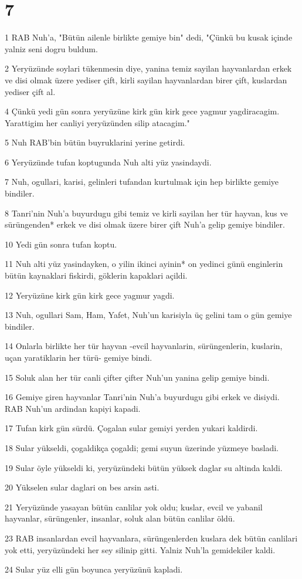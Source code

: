 \chapter{7}

\par 1 RAB Nuh'a, "Bütün ailenle birlikte gemiye bin" dedi, "Çünkü bu kusak içinde yalniz seni dogru buldum.
\par 2 Yeryüzünde soylari tükenmesin diye, yanina temiz sayilan hayvanlardan erkek ve disi olmak üzere yediser çift, kirli sayilan hayvanlardan birer çift, kuslardan yediser çift al.
\par 4 Çünkü yedi gün sonra yeryüzüne kirk gün kirk gece yagmur yagdiracagim. Yarattigim her canliyi yeryüzünden silip atacagim."
\par 5 Nuh RAB'bin bütün buyruklarini yerine getirdi.
\par 6 Yeryüzünde tufan koptugunda Nuh alti yüz yasindaydi.
\par 7 Nuh, ogullari, karisi, gelinleri tufandan kurtulmak için hep birlikte gemiye bindiler.
\par 8 Tanri'nin Nuh'a buyurdugu gibi temiz ve kirli sayilan her tür hayvan, kus ve sürüngenden* erkek ve disi olmak üzere birer çift Nuh'a gelip gemiye bindiler.
\par 10 Yedi gün sonra tufan koptu.
\par 11 Nuh alti yüz yasindayken, o yilin ikinci ayinin* on yedinci günü enginlerin bütün kaynaklari fiskirdi, göklerin kapaklari açildi.
\par 12 Yeryüzüne kirk gün kirk gece yagmur yagdi.
\par 13 Nuh, ogullari Sam, Ham, Yafet, Nuh'un karisiyla üç gelini tam o gün gemiye bindiler.
\par 14 Onlarla birlikte her tür hayvan -evcil hayvanlarin, sürüngenlerin, kuslarin, uçan yaratiklarin her türü- gemiye bindi.
\par 15 Soluk alan her tür canli çifter çifter Nuh'un yanina gelip gemiye bindi.
\par 16 Gemiye giren hayvanlar Tanri'nin Nuh'a buyurdugu gibi erkek ve disiydi. RAB Nuh'un ardindan kapiyi kapadi.
\par 17 Tufan kirk gün sürdü. Çogalan sular gemiyi yerden yukari kaldirdi.
\par 18 Sular yükseldi, çogaldikça çogaldi; gemi suyun üzerinde yüzmeye basladi.
\par 19 Sular öyle yükseldi ki, yeryüzündeki bütün yüksek daglar su altinda kaldi.
\par 20 Yükselen sular daglari on bes arsin asti.
\par 21 Yeryüzünde yasayan bütün canlilar yok oldu; kuslar, evcil ve yabanil hayvanlar, sürüngenler, insanlar, soluk alan bütün canlilar öldü.
\par 23 RAB insanlardan evcil hayvanlara, sürüngenlerden kuslara dek bütün canlilari yok etti, yeryüzündeki her sey silinip gitti. Yalniz Nuh'la gemidekiler kaldi.
\par 24 Sular yüz elli gün boyunca yeryüzünü kapladi.

